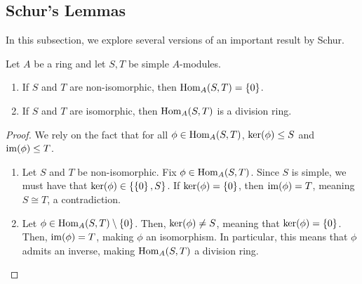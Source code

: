 
\subsection{Schur's Lemmas}

In this subsection, we explore several versions of an important result by Schur.

\begin{theorem}
    Let $A$ be a ring and let $S, T$ be simple $A$-modules.
    \begin{enumerate}[label = \normalfont \arabic*., noitemsep]
        \item If $S$ and $T$ are non-isomorphic, then $\operatorname{Hom}_A(S, T) = \left\{ 0 \right\}$.
        \item If $S$ and $T$ are isomorphic, then $\operatorname{Hom}_A(S,T)$ is a division ring.
    \end{enumerate}
\end{theorem}
\begin{proof}
    We rely on the fact that for all $\phi \in \operatorname{Hom}_A(S, T)$, $\operatorname{ker}\!\left( \phi \right) \leq S$ and $\operatorname{im}\!\left( \phi \right) \leq T$.
    \begin{enumerate}
        \item Let $S$ and $T$ be non-isomorphic. Fix $\phi \in \operatorname{Hom}_A(S,T)$. Since $S$ is simple, we must have that $\operatorname{ker}\!\left( \phi \right) \in \left\{ \left\{ 0 \right\}, S \right\}$. If $\operatorname{ker}\!\left( \phi \right) = \left\{ 0 \right\}$, then $\operatorname{im}\!\left( \phi \right) = T$, meaning $S \cong T$, a contradiction.
        \item Let $\phi \in \operatorname{Hom}_A(S,T) \setminus \left\{ 0 \right\}$. Then, $\operatorname{ker}\!\left( \phi \right) \neq S$, meaning that $\operatorname{ker}\!\left( \phi \right) = \left\{ 0 \right\}$. Then, $\operatorname{im}\!\left( \phi \right) = T$, making $\phi$ an isomorphism. In particular, this means that $\phi$ admits an inverse, making $\operatorname{Hom}_A(S,T)$ a division ring.
    \end{enumerate}
\end{proof}

